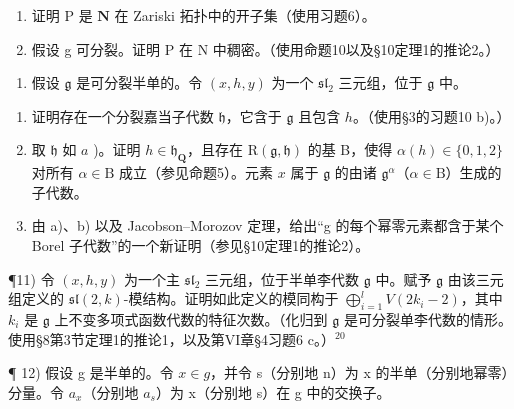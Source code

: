 \begin{enumerate}
\def\labelenumi{\alph{enumi})}
\item
  证明 \(\mathrm{P}\) 是 \(\mathbf{N}\) 在 Zariski 拓扑中的开子集（使用习题6）。
\item
  假设 g 可分裂。证明 P 在 N 中稠密。（使用命题10以及§10定理1的推论2。）
\end{enumerate}

\begin{enumerate}
\def\labelenumi{\arabic{enumi})}
\setcounter{enumi}{9}
\tightlist
\item
  假设 \(\mathfrak{g}\) 是可分裂半单的。令 \((x,h,y)\) 为一个 \(\mathfrak{sl}_2\) 三元组，位于 \(\mathfrak{g}\) 中。
\end{enumerate}

\begin{enumerate}
\def\labelenumi{\alph{enumi})}
\item
  证明存在一个分裂嘉当子代数 \(\mathfrak{h}\)，它含于 \(\mathfrak{g}\) 且包含 \(h\)。（使用§3的习题10 b)。）
\item
  取 \(\mathfrak{h}\) 如 \(a\) )。证明 \(h \in \mathfrak{h}_{\mathbf{Q}}\)，且存在 \(\mathrm{R}(\mathfrak{g}, \mathfrak{h})\) 的基 B，使得 \(\alpha(h) \in \{0, 1, 2\}\) 对所有 \(\alpha \in \mathrm{B}\) 成立（参见命题5）。元素 \(x\) 属于 \(\mathfrak{g}\) 的由诸 \(\mathfrak{g}^{\alpha}\)（\(\alpha \in \mathrm{B}\)）生成的子代数。
\item
  由 a)、b) 以及 Jacobson–Morozov 定理，给出“g 的每个幂零元素都含于某个 Borel 子代数”的一个新证明（参见§10定理1的推论2）。
\end{enumerate}

¶11) 令 \((x,h,y)\) 为一个主 \(\mathfrak{sl}_2\) 三元组，位于半单李代数 \(\mathfrak{g}\) 中。赋予 \(\mathfrak{g}\) 由该三元组定义的 \(\mathfrak{sl}(2,k)\)-模结构。证明如此定义的模同构于 \(\bigoplus_{i=1}^{l} V(2k_i - 2)\)，其中 \(k_i\) 是 \(\mathfrak{g}\) 上不变多项式函数代数的特征次数。（化归到 \(\mathfrak{g}\) 是可分裂单李代数的情形。使用§8第3节定理1的推论1，以及第VI章§4习题6 c。）\(^{20}\)

¶ 12) 假设 g 是半单的。令 \(x \in g\)，并令 s（分别地 n）为 x 的半单（分别地幂零）分量。令 \(a_{x}\)（分别地 \(a_{s}\)）为 x（分别地 s）在 g 中的交换子。

